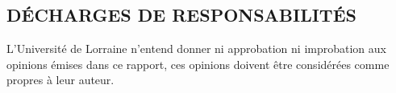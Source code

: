 \thispagestyle{empty} %
\begin{center}
    \section{\huge\textbf{DÉCHARGES DE RESPONSABILITÉS}}
\end{center}

\normalsize{L’Université de Lorraine n’entend donner ni approbation ni improbation aux opinions émises dans ce rapport, ces opinions doivent être considérées comme propres à leur auteur.}
\clearpage